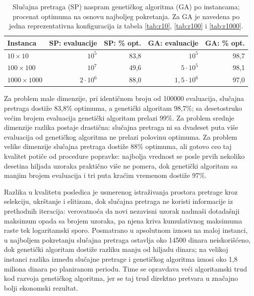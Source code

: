 \documentclass[12pt]{article}
\begin{document}
\begin{table}[H]
\centering
\begin{tabular}{|l|r|r|r|r|}
\hline
Instanca & SP: evaluacije & SP: \% opt. & GA: evaluacije & GA: \% opt. \\ \hline
$10 \times 10$     & $10^5$          & 83,8 & $10^5$              & 98,7 \\ \hline
$100 \times 100$   & $10^7$          & 49,6 & $5 \cdot 10^5$      & 98,1 \\ \hline
$1000 \times 1000$ & $2 \cdot 10^6$  & 88,0 & $1{,}5 \cdot 10^6$  & 97,0 \\ \hline
\end{tabular}
\caption{Slučajna pretraga (SP) naspram genetičkog algoritma (GA) po instancama; procenat optimuma na osnovu najboljeg pokretanja. Za GA je navedena po jedna reprezentativna konfiguracija iz tabela \ref{tab:r10}, \ref{tab:r100} i \ref{tab:r1000}.}
\label{tab:rs-vs-ga}
\end{table}

Za problem male dimenzije, pri identičnom broju od 100000 evaluacija, slučajna pretraga dostiže 83,8\% optimuma, a genetički algoritam 98,7\%; sa desetostruko većim brojem evaluacija genetički algoritam prelazi 99\%. Za problem srednje dimenzije razlika postaje drastična: slučajna pretraga ni sa dvadeset puta više evaluacija od genetičkog algoritma ne prelazi polovinu optimuma. Za problem velike dimenzije slučajna pretraga dostiže 88\% optimuma, ali gotovo ceo taj kvalitet potiče od procedure popravke: najbolja vrednost se posle prvih nekoliko desetina hiljada uzoraka praktično više ne pomera, dok genetički algoritam sa manjim brojem evaluacija i tri puta kraćim vremenom dostiže 97\%.

Razlika u kvalitetu posledica je usmerenog istraživanja prostora pretrage kroz selekciju, ukrštanje i elitizam, dok slučajna pretraga ne koristi informacije iz prethodnih iteracija: verovatnoća da novi nezavisni uzorak nadmaši dotadašnji maksimum opada sa brojem uzoraka, pa njena kriva kumulativnog maksimuma raste tek logaritamski sporo. Posmatrano u apsolutnom iznosu na maloj instanci, u najboljem pokretanju slučajna pretraga ostavlja oko 14500 dinara neiskorišćeno, dok genetički algoritam dostiže razliku manju od hiljadu dinara; na velikoj instanci razlika između slučajne pretrage i genetičkog algoritma iznosi oko 1,8 miliona dinara po planiranom periodu. Time se opravdava veći algoritamski trud kod razvoja genetičkog algoritma, jer se taj trud direktno pretvara u značajno bolji ekonomski rezultat.
\end{document}
